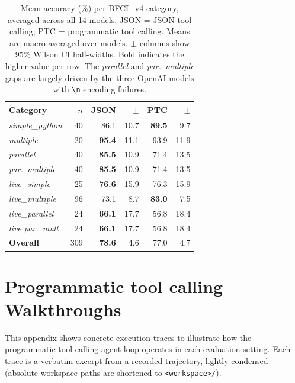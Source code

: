 \documentclass[11pt]{article}
\newcommand{\bfcl}{BFCL~v4}
\newcommand{\codemode}{programmatic tool calling}
\newcommand{\Codemode}{Programmatic tool calling}
\newcommand{\nmodels}{14}
\begin{document}
\begin{table}[H]
\centering
\footnotesize
\setlength{\tabcolsep}{3pt}
\begin{tabular}{lrrrrr}
\toprule
\textbf{Category} & \textbf{$n$} & \textbf{JSON} & \textbf{$\pm$} & \textbf{PTC} & \textbf{$\pm$} \\
\midrule
\textit{simple\_python}   &  40 & 86.1 & 10.7 & \textbf{89.5} &  9.7 \\
\textit{multiple}         &  20 & \textbf{95.4} & 11.1 & 93.9 & 11.9 \\
\textit{parallel}         &  40 & \textbf{85.5} & 10.9 & 71.4 & 13.5 \\
\textit{par.\ multiple}   &  40 & \textbf{85.5} & 10.9 & 71.4 & 13.5 \\
\textit{live\_simple}     &  25 & \textbf{76.6} & 15.9 & 76.3 & 15.9 \\
\textit{live\_multiple}   &  96 & 73.1 &  8.7 & \textbf{83.0} &  7.5 \\
\textit{live\_parallel}   &  24 & \textbf{66.1} & 17.7 & 56.8 & 18.4 \\
\textit{live par.\ mult.} &  24 & \textbf{66.1} & 17.7 & 56.8 & 18.4 \\
\midrule
\textbf{Overall}          & 309 & \textbf{78.6} &  4.6 & 77.0 &  4.7 \\
\bottomrule
\end{tabular}
\caption{Mean accuracy (\%) per \bfcl{} category, averaged across all
\nmodels{} models. JSON = JSON tool calling; PTC = programmatic tool calling. Means are macro-averaged
over models. $\pm$ columns show 95\% Wilson CI half-widths.
Bold indicates the higher value per row. The \textit{parallel} and
\textit{par.\ multiple} gaps are largely driven by the three OpenAI models
with \texttt{\textbackslash n} encoding failures.}
\label{tab:per_category}
\end{table}

\section{\Codemode{} Walkthroughs}
\label{app:walkthroughs}

This appendix shows concrete execution traces to illustrate how the \codemode{}
agent loop operates in each evaluation setting.
Each trace is a verbatim excerpt from a recorded trajectory, lightly condensed
(absolute workspace paths are shortened to \texttt{<workspace>/}).

\end{document}
